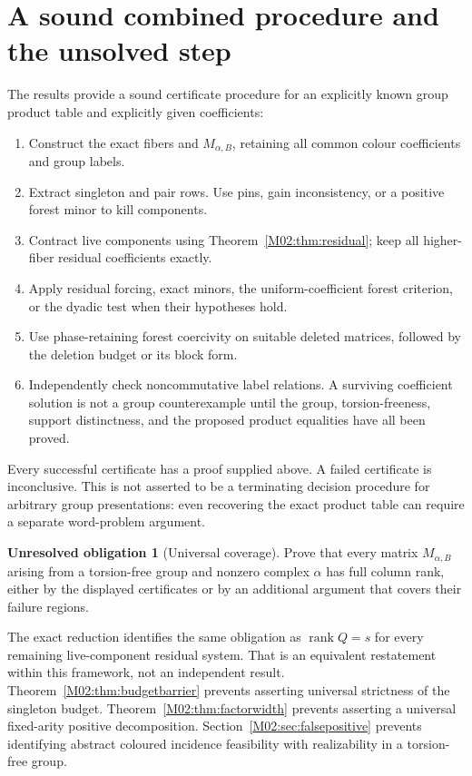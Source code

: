 \documentclass[11pt,a4paper,oneside]{report}
\theoremstyle{definition}
\newtheorem{problem}[theorem]{Unresolved obligation}
\theoremstyle{remark}
\DeclareMathOperator{\rank}{rank}
\begin{document}
\section{A sound combined procedure and the unsolved step}
The results provide a sound certificate procedure for an explicitly known group product table and explicitly given coefficients:
\begin{enumerate}
\item Construct the exact fibers and \(M_{\alpha,B}\), retaining all common colour coefficients and group labels.
\item Extract singleton and pair rows. Use pins, gain inconsistency, or a positive forest minor to kill components.
\item Contract live components using Theorem~\ref{M02:thm:residual}; keep all higher-fiber residual coefficients exactly.
\item Apply residual forcing, exact minors, the uniform-coefficient forest criterion, or the dyadic test when their hypotheses hold.
\item Use phase-retaining forest coercivity on suitable deleted matrices, followed by the deletion budget or its block form.
\item Independently check noncommutative label relations. A surviving coefficient solution is not a group counterexample until the group, torsion-freeness, support distinctness, and the proposed product equalities have all been proved.
\end{enumerate}
Every successful certificate has a proof supplied above. A failed certificate is inconclusive. This is not asserted to be a terminating decision procedure for arbitrary group presentations: even recovering the exact product table can require a separate word-problem argument.
\begin{problem}[Universal coverage]\label{M02:prob:coverage}
Prove that every matrix \(M_{\alpha,B}\) arising from a torsion-free group and nonzero complex \(\alpha\) has full column rank, either by the displayed certificates or by an additional argument that covers their failure regions.
\end{problem}
The exact reduction identifies the same obligation as \(\rank Q=s\) for every remaining live-component residual system. That is an equivalent restatement within this framework, not an independent result. Theorem~\ref{M02:thm:budgetbarrier} prevents asserting universal strictness of the singleton budget. Theorem~\ref{M02:thm:factorwidth} prevents asserting a universal fixed-arity positive decomposition. Section~\ref{M02:sec:falsepositive} prevents identifying abstract coloured incidence feasibility with realizability in a torsion-free group.
\end{document}
